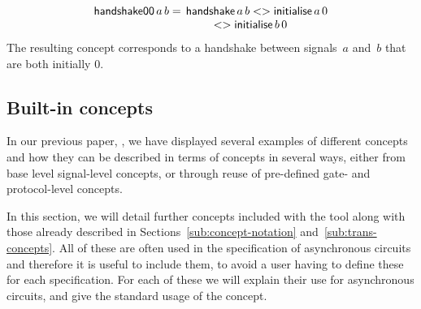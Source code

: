 \documentclass[british,conference,compsoc]{IEEEtran}
\begin{document}
\[
\begin{array}{lcl}
\mathsf{handshake00}\, a\, b =&\hspace{-2mm}\mathsf{handshake}\,a\, b <> \mathsf{initialise}\,a\, 0 \\
&\hspace{-6mm}<> \mathsf{initialise}\,b\, 0
\end{array}
\]
The resulting concept corresponds to a handshake between signals~$a$
and~$b$ that are both initially $0$.


\subsection{Built-in concepts \label{sub:built-in}}

In our previous paper, \cite{2015_Beaumont_MEMOCODE}, we have displayed several examples of
different concepts and how they can be described in terms of concepts in several ways,
either from base level signal-level concepts, or through reuse of pre-defined 
gate- and protocol-level concepts.

In this section, we will detail further concepts included with the tool along with those 
already described in Sections~\ref{sub:concept-notation} and~\ref{sub:trans-concepts}. 
All of these are often used in the specification of asynchronous circuits and 
therefore it is useful to include them, to avoid a user having to define these for 
each specification. For each of these we will explain their use for asynchronous 
circuits, and give the standard usage of the concept. 
\end{document}
